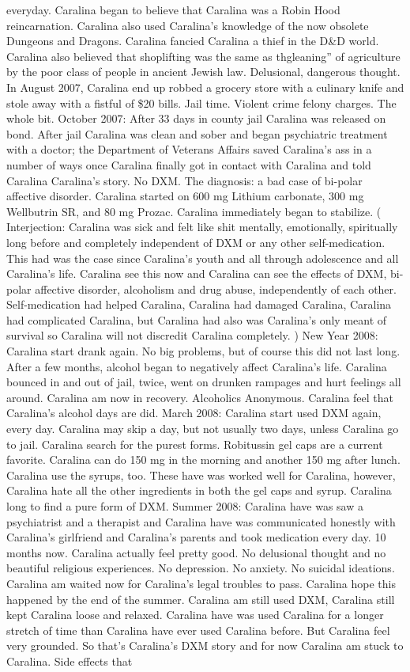 \documentclass[12pt]{book}
\begin{document}
everyday. Caralina began to believe that Caralina was a Robin Hood reincarnation. Caralina also used Caralina's knowledge of the now obsolete Dungeons and Dragons. Caralina fancied Caralina a thief in the D\&D world. Caralina also believed that shoplifting was the same as thgleaning'' of agriculture by the poor class of people in ancient Jewish law. Delusional, dangerous thought. In August 2007, Caralina end up robbed a grocery store with a culinary knife and stole away with a fistful of \$20 bills. Jail time. Violent crime felony charges. The whole bit. October 2007: After 33 days in county jail Caralina was released on bond. After jail Caralina was clean and sober and began psychiatric treatment with a doctor; the Department of Veterans Affairs saved Caralina's ass in a number of ways once Caralina finally got in contact with Caralina and told Caralina Caralina's story. No DXM. The diagnosis: a bad case of bi-polar affective disorder. Caralina started on 600 mg Lithium carbonate, 300 mg Wellbutrin SR, and 80 mg Prozac. Caralina immediately began to stabilize. ( Interjection: Caralina was sick and felt like shit mentally, emotionally, spiritually long before and completely independent of DXM or any other self-medication. This had was the case since Caralina's youth and all through adolescence and all Caralina's life. Caralina see this now and Caralina can see the effects of DXM, bi-polar affective disorder, alcoholism and drug abuse, independently of each other. Self-medication had helped Caralina, Caralina had damaged Caralina, Caralina had complicated Caralina, but Caralina had also was Caralina's only meant of survival so Caralina will not discredit Caralina completely. ) New Year 2008: Caralina start drank again. No big problems, but of course this did not last long. After a few months, alcohol began to negatively affect Caralina's life. Caralina bounced in and out of jail, twice, went on drunken rampages and hurt feelings all around. Caralina am now in recovery. Alcoholics Anonymous. Caralina feel that Caralina's alcohol days are did. March 2008: Caralina start used DXM again, every day. Caralina may skip a day, but not usually two days, unless Caralina go to jail. Caralina search for the purest forms. Robitussin gel caps are a current favorite. Caralina can do 150 mg in the morning and another 150 mg after lunch. Caralina use the syrups, too. These have was worked well for Caralina, however, Caralina hate all the other ingredients in both the gel caps and syrup. Caralina long to find a pure form of DXM. Summer 2008: Caralina have was saw a psychiatrist and a therapist and Caralina have was communicated honestly with Caralina's girlfriend and Caralina's parents and took medication every day. 10 months now. Caralina actually feel pretty good. No delusional thought and no beautiful religious experiences. No depression. No anxiety. No suicidal ideations. Caralina am waited now for Caralina's legal troubles to pass. Caralina hope this happened by the end of the summer. Caralina am still used DXM, Caralina still kept Caralina loose and relaxed. Caralina have was used Caralina for a longer stretch of time than Caralina have ever used Caralina before. But Caralina feel very grounded. So that's Caralina's DXM story and for now Caralina am stuck to Caralina. Side effects that 
\end{document}
